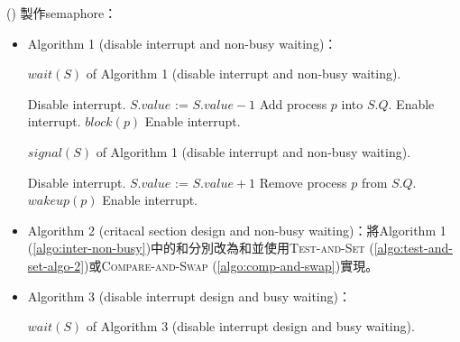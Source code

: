 \begin{theorem}{()} 製作semaphore：\begin{itemize}
        \item Algorithm 1 (disable interrupt and non-busy waiting)：\label{algo:inter-non-busy}
        \begin{algorithm}[H]
            \caption{$wait(S)$ of Algorithm 1 (disable interrupt and non-busy waiting).}
            \begin{algorithmic}[1]
                    \State Disable interrupt.
                    \State $S.value$ := $S.value - 1$
                        \State Add process $p$ into $S.Q$.
                        \State Enable interrupt.
                        \State $block(p)$ 
                    \Else 
                        \State Enable interrupt.
                    \EndIf
                \EndFunction
            \end{algorithmic}
        \end{algorithm}
        \begin{algorithm}[H]
            \caption{$signal(S)$ of Algorithm 1 (disable interrupt and non-busy waiting).}
            \begin{algorithmic}[1]
                    \State Disable interrupt.
                    \State $S.value$ := $S.value + 1$
                        \State Remove process $p$ from $S.Q$.
                        \State $wakeup(p)$ 
                    \EndIf
                    \State Enable interrupt.
                \EndFunction
            \end{algorithmic}
        \end{algorithm}
        \item Algorithm 2 (critacal section design and non-busy waiting)：\label{algo:cs-non-busy}將Algorithm 1 (\ref{algo:inter-non-busy})中的和分別改為和並使用\textsc{Test-and-Set} (\ref{algo:test-and-set-algo-2})或\textsc{Compare-and-Swap} (\ref{algo:comp-and-swap})實現。
        \item Algorithm 3 (disable interrupt design and busy waiting)：\label{algo:inter-busy}
        \begin{algorithm}[H]
            \caption{$wait(S)$ of Algorithm 3 (disable interrupt design and busy waiting).}

\end{algorithm}
\end{itemize}
\end{theorem}
